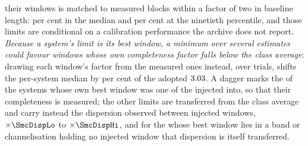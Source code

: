their windows is matched to measured blocks within a factor of two in baseline
length: \RpDecMatchMed{} per cent in the median and \RpDecMatchHi{} per cent
at the ninetieth percentile, and those limits are conditional on a calibration
performance the archive does not report.
\emph{Because a system's limit is its best window, a minimum over several
estimates could favour windows whose own completeness factor falls below the
class average}: drawing each window's factor from the \SensNInj{} measured
ones instead, over \ScRsNTrial{} trials, shifts the per-system median by
\ScRsMedShiftPct{} per cent of the adopted $3.03$. A dagger marks
the \SmcNMeasSys{} of the \NSysALim{} systems whose own best window was
one of the \SensNInj{} injected into, so that their completeness is
measured; the other \SmcNEstSys{} limits are transferred from the class
average and carry instead
the dispersion observed between injected windows, $\times\SmcDispLo$ to
$\times\SmcDispHi$, and for the \NgNExtrapSys{} \NgExtrapSysNoun{} whose
best window lies in a band or channelisation holding no injected window that
dispersion is itself transferred.

\begin{table}
\centering
\caption{\textbf{Per-system sensitivity of the carrier search.} For each of
the \NSysClassA{} systems the fine-channel search covers, the
$\mathrm{EIRP}_{90}$ of its best window with its own primary-beam,
annual-parallax and smearing retentions applied, ordered by the limit.
Columns, daggers and dashes are defined above.}
\label{tab:persys}
\footnotesize

\end{table}
